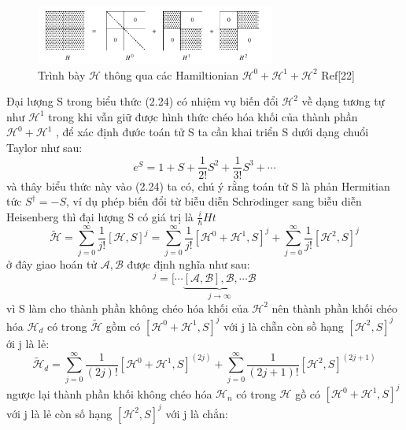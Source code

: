   \begin{figure}[hc]
  \centering
  \includegraphics[width=0.70\textwidth]{./Figures/lowd2.png}
  \caption[ Representation of H ]{Trình bày $\mathcal{H}$ thông qua các Hamiltionian $\mathcal{H}^0 + \mathcal{H}^1 +\mathcal{H}^2$ Ref[22]}
  \label{fig: Representation of H }
  \end{figure}
  Đại lượng S trong biểu thức (2.24) có nhiệm vụ biến đổi $\mathcal{H}^2$ về dạng tương tự như $\mathcal{H}^1$ trong khi vẫn giữ được hình thức chéo hóa khối của thành phần $\mathcal{H}^0+\mathcal{H}^1$ , để xác định đước toán tử S ta cần khai triển S dưới dạng chuổi Taylor như sau:
  \begin{equation}
  e^S = 1 +S + \frac{1}{2!}S^2 +\frac{1}{3!}S^3 +\dotsi
  \end{equation}
  và thây biểu thức này vào (2.24) ta có, chú ý rằng toán tử S là phản Hermitian tức $S^{\dagger} =-S$, ví dụ phép biến đổi từ biễu diễn Schr$\ddot{o}$dinger sang biễu diễn Heisenberg thì đại lượng S có giá trị là $\frac{i}{\hbar}Ht$
  \begin{equation}
  \tilde{\mathcal{H}} = \sum_{j=0}^{\infty}\frac{1}{j!}[\mathcal{H},S]^{j} = \sum_{j=0}^{\infty}\frac{1}{j!}[\mathcal{H}^0 +\mathcal{H}^1,S]^{j}+\sum_{j=0}^{\infty}\frac{1}{j!}[\mathcal{H}^2,S]^{j}
  \end{equation}
  ở đây giao hoán tử $\mathcal{A},\mathcal{B}$ được định nghĩa như sau:
  \begin{equation}
  [\mathcal{A},\mathcal{B}]^{j} = [\cdots\underbrace{[\mathcal{A},\mathcal{B}],\mathcal{B},\cdots \mathcal{B}}_{j\longrightarrow \infty}
  \end{equation}
  vì S làm cho thành phần không chéo hóa khối của $\mathcal{H}^2$ nên thành phần khối chéo hóa $\mathcal{H}_d$ có trong $\tilde{\mathcal{H}}$ gồm có $[\mathcal{H}^0 +\mathcal{H}^1,S]^{j}$ với j là chẵn còn sồ hạng $[\mathcal{H}^2,S]^{j}$ ới j là lẻ:
  \begin{equation}
  \tilde{\mathcal{H}}_d  = \sum_{j=0}^{\infty}\frac{1}{(2j)!}[\mathcal{H}^0 +\mathcal{H}^1,S]^{(2j)}+\sum_{j=0}^{\infty}\frac{1}{(2j+1)!}[\mathcal{H}^2,S]^{(2j+1)}
  \end{equation}
  ngược lại thành phần khối không chéo hóa $\mathcal{H}_n$ có trong $\mathcal{H}$ gồ có $[\mathcal{H}^0 +\mathcal{H}^1,S]^{j}$ với j là lẻ còn số hạng $[\mathcal{H}^2,S]^{j}$ với j là chẳn:

